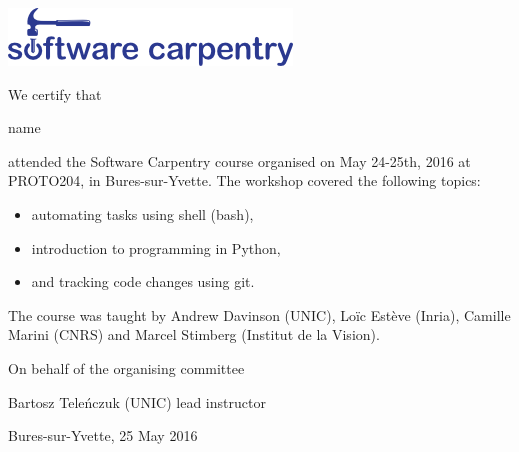\documentclass[a4paper,12pt]{article}
\begin{document}
\thispagestyle{empty}
\begin{center}
\includegraphics{software-carpentry-banner.png}
\vspace{2.5cm}
\end{center}

We certify that

\vspace{1cm}

\begin{center}

    {\Large {{ name }}}

\end{center}

\vspace{1cm}

\noindent attended the Software Carpentry course organised on May 24-25th, 2016 at PROTO204, in Bures-sur-Yvette. The workshop covered the following topics:

\begin{itemize}
    \item automating tasks using shell (bash),
    \item introduction to programming in Python,
    \item and tracking code changes using git.
\end{itemize} 

The course was taught by Andrew Davinson (UNIC), Loïc Estève (Inria), Camille Marini (CNRS) and Marcel Stimberg (Institut de la Vision).

\vspace{1cm}


\noindent On behalf of the organising committee

\vspace{2cm}

\noindent Bartosz Tele\'{n}czuk (UNIC) \newline
lead instructor

\vspace{1cm}

\noindent Bures-sur-Yvette, 25 May 2016
\end{document}

